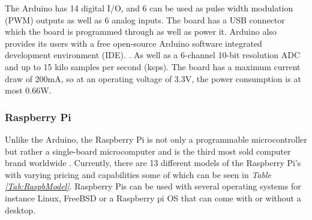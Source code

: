 The Arduino has 14 digital I/O, and 6 can be used as pulse width modulation (PWM) outputs as well as 6 analog inputs.
The board has a USB connector which the board is programmed through as well as power it.
Arduino also provides its users with a free open-source Arduino software integrated development environment (IDE).  \cite{noauthor_arduino_nodate}.
As well as a 6-channel 10-bit resolution ADC and up to 15 kilo samples per second (ksps).
The board has a maximum current draw of 200mA, so at an operating voltage of 3.3V, the power consumption is at most 0.66W\cite{noauthor_atmega328p_nodate}.


\subsubsection{Raspberry Pi}

Unlike the Arduino, the Raspberry Pi is not only a programmable microcontroller but rather a single-board microcomputer and is the third most sold computer brand worldwide \cite{noauthor_faqs_nodate}.
Currently, there are 13 different models of the Raspberry Pi's with varying pricing and capabilities some of which can be seen in \textit{Table \ref{Tab:RaspbModel}}. 
Raspberry Pis can be used with several operating systems for instance Linux, FreeBSD or a Raspberry pi OS that can come with or without a desktop.


